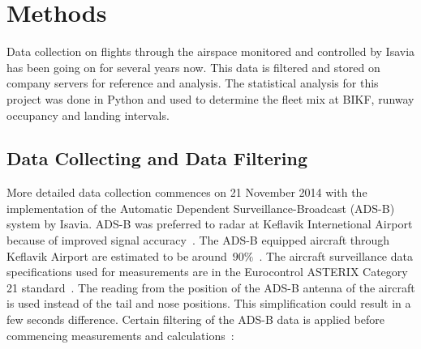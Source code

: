

\chapter{Methods\label{cha:methods}}
Data collection on flights through the airspace monitored and controlled by Isavia has been going on for several years now. This data is filtered and stored on company servers for reference and analysis. The statistical analysis for this project was done in Python and used to determine the fleet mix at BIKF, runway occupancy and landing intervals.

\section{Data Collecting and Data Filtering}
More detailed data collection commences on 21 November 2014 with the implementation of the Automatic Dependent Surveillance-Broadcast (ADS-B) system by Isavia. ADS-B was preferred to radar at Keflavik Internetional Airport because of improved signal accuracy~\cite{isavia_wiki}. The ADS-B equipped aircraft through Keflavik Airport are estimated to be around~$90\%$~\cite{isavia-rounardeild_rannsoknir_2018}. The aircraft surveillance data specifications used for measurements are in the Eurocontrol ASTERIX Category 21 standard~\cite{ASTERIX_ADS-B_specs}.
The reading from the position of the ADS-B antenna of the aircraft is used instead of the tail and nose positions. This simplification could result in a few seconds difference. Certain filtering of the ADS-B data is applied before commencing measurements and calculations~\cite{isavia_wiki}: 
